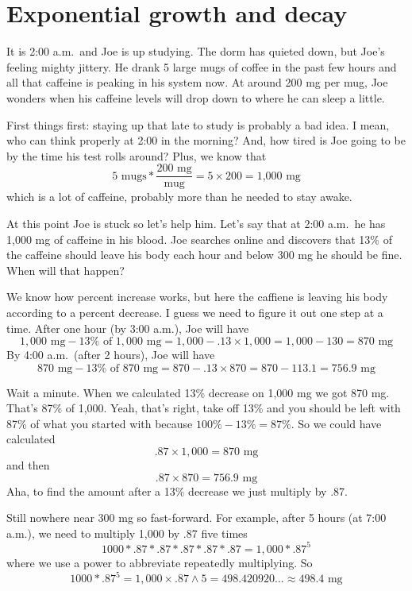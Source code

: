 \section{Exponential growth and decay}

It is 2:00 a.m.\ and Joe is up studying.  The dorm has quieted down, but Joe's feeling mighty jittery.  He  drank 5 large mugs of coffee in the past few hours and all that caffeine is peaking in his system now.  At around 200 mg per mug, Joe wonders when his caffeine levels will drop down to where he can sleep a little.  

First things first:  staying up that late to study is probably a bad idea.  I mean, who can think properly at 2:00 in the morning?  And, how tired is Joe going to be by the time his test rolls around?  Plus, we know that
$$5 \text{ mugs} \ast \frac{200 \text{ mg}}{\text{mug}} = 5 \times 200 = \text{1,000 mg}$$
which is a lot of caffeine, probably more than he needed to stay awake.  

At this point Joe is stuck so let's help him. Let's say that at 2:00 a.m.\ he has 1,000 mg of caffeine in his blood.  Joe searches online and discovers that 13\% of the caffeine should leave his body each hour and below 300 mg he should be fine.  When will that happen?

We know how percent increase works, but here the caffiene is leaving his body according to a percent decrease.  I guess we need to figure it out one step at a time.  After one hour (by 3:00 a.m.), Joe will have 
$$  1,000 \text{ mg} - 13 \% \text{ of }  1,000 \text{ mg} =  1,000- .13 \times  1,000 =  1,000 - 130 = 870 \text{ mg}$$
By 4:00 a.m.\ (after 2 hours), Joe will have
$$ 870 \text{ mg} - 13 \% \text{ of } 870 \text{ mg} = 870 - .13 \times 870 = 870 - 113.1 =  756.9 \text{ mg}$$

Wait a minute.  When we calculated 13\% decrease on  1,000 mg we got 870 mg.  That's 87\% of 1,000.  Yeah, that's right, take off 13\% and you should be left with 87\% of what you started with because $100\% - 13\% = 87\%$.
So we could have calculated 
$$ .87 \times 1,000 = 870 \text{ mg}$$
and then $$.87 \times 870 = 756.9 \text{ mg}$$
Aha, to find the amount after a 13\% decrease we just multiply by .87.

Still nowhere near 300 mg so fast-forward.  For example, after 5 hours (at 7:00 a.m.), we need to multiply  1,000 by .87 five times
$$1000 \ast .87 \ast .87 \ast .87 \ast .87 \ast .87=  1,000 \ast .87^5$$
where we use a power to abbreviate repeatedly multiplying.  So
$$1000 \ast .87^5 =  1,000 \times .87 \wedge 5 = 498.420920\ldots \approx 498.4 \text{ mg}$$

